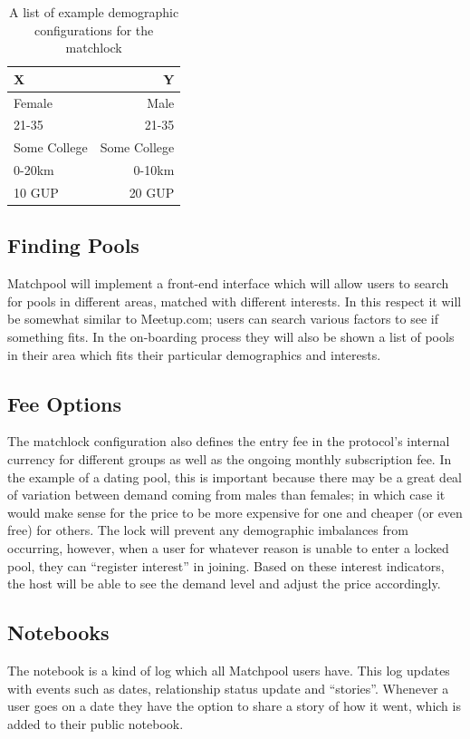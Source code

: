 \documentclass[a4paper]{article}
\begin{document}
\begin{table}[!h]
\centering
\begin{tabular}{l|r}
X & Y \\\hline
Female & Male \\
21-35 & 21-35 \\
Some College & Some College \\
0-20km & 0-10km \\
10 GUP & 20 GUP
\end{tabular}
\caption{\label{tab:widgets}A list of example demographic configurations for the matchlock }
\end{table}


\subsection{Finding Pools}
Matchpool will implement a front-end interface which will allow users to search for pools in different areas, matched with different interests. In this respect it will be somewhat similar to Meetup.com; users can search various factors to see if something fits. In the on-boarding process they will also be shown a list of pools in their area which fits their particular demographics and interests.

\subsection{Fee Options}

The matchlock configuration also defines the entry fee in the protocol's internal currency for different groups as well as the ongoing monthly subscription fee. In the example of a dating pool, this is important because there may be a great deal of variation between demand coming from males than females; in which case it would make sense for the price to be more expensive for one and cheaper (or even free) for others. The lock will prevent any demographic imbalances from occurring, however, when a user for whatever reason is unable to enter a locked pool, they can “register interest” in joining. Based on these interest indicators, the host will be able to see the demand level and adjust the price accordingly.

\subsection{Notebooks}
The notebook is a kind of log which all Matchpool users have. This log updates with events such as dates, relationship status update and “stories”. Whenever a user goes on a date they have the option to share a story of how it went, which is added to their public notebook.
\end{document}
